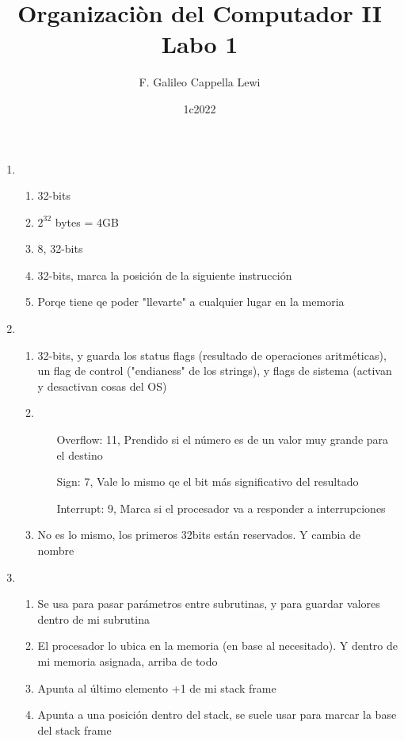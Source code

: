 \documentclass[12pt]{article}
\title{Organizaciòn del Computador II
\large Labo 1}
\author{F. Galileo Cappella Lewi}
\date{1c2022}
\begin{document}
\begin{enumerate}
\item \begin{enumerate} %

\item 32-bits
\item \(2^32\) bytes = 4GB
\item 8, 32-bits
\item 32-bits, marca la posición de la siguiente instrucción
\item Porqe tiene qe poder "llevarte" a cualquier lugar en la memoria

\end{enumerate}

\item \begin{enumerate} %

\item 32-bits, y guarda los status flags (resultado de operaciones aritméticas), un flag de control ("endianess" de los strings), y flags de sistema (activan y desactivan cosas del OS)
\item \begin{itemize} \
	\item[Overflow:] 11, Prendido si el número es de un valor muy grande para el destino 
	\item[Sign:] 7, Vale lo mismo qe el bit más significativo del resultado
	\item[Interrupt:] 9, Marca si el procesador va a responder a interrupciones
\end{itemize}
\item No es lo mismo, los primeros 32bits están reservados. Y cambia de nombre

\end{enumerate}

\item \begin{enumerate} %

\item Se usa para pasar parámetros entre subrutinas, y para guardar valores dentro de mi subrutina
\item El procesador lo ubica en la memoria (en base al necesitado). Y dentro de mi memoria asignada, arriba de todo
\item Apunta al último elemento +1 de mi stack frame 
\item Apunta a una posición dentro del stack, se suele usar para marcar la base del stack frame


\end{enumerate}
\end{enumerate}
\end{document}
